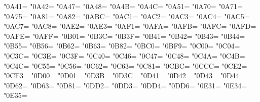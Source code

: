 \XeTeXcharclass"0A41=\KclassNum
\XeTeXcharclass"0A42=\KclassNum
\XeTeXcharclass"0A47=\KclassNum
\XeTeXcharclass"0A48=\KclassNum
\XeTeXcharclass"0A4B=\KclassNum
\XeTeXcharclass"0A4C=\KclassNum
\XeTeXcharclass"0A51=\KclassNum
\XeTeXcharclass"0A70=\KclassNum
\XeTeXcharclass"0A71=\KclassNum
\XeTeXcharclass"0A75=\KclassNum
\XeTeXcharclass"0A81=\KclassNum
\XeTeXcharclass"0A82=\KclassNum
\XeTeXcharclass"0ABC=\KclassNum
\XeTeXcharclass"0AC1=\KclassNum
\XeTeXcharclass"0AC2=\KclassNum
\XeTeXcharclass"0AC3=\KclassNum
\XeTeXcharclass"0AC4=\KclassNum
\XeTeXcharclass"0AC5=\KclassNum
\XeTeXcharclass"0AC7=\KclassNum
\XeTeXcharclass"0AC8=\KclassNum
\XeTeXcharclass"0AE2=\KclassNum
\XeTeXcharclass"0AE3=\KclassNum
\XeTeXcharclass"0AF1=\KclassNum
\XeTeXcharclass"0AFA=\KclassNum
\XeTeXcharclass"0AFB=\KclassNum
\XeTeXcharclass"0AFC=\KclassNum
\XeTeXcharclass"0AFD=\KclassNum
\XeTeXcharclass"0AFE=\KclassNum
\XeTeXcharclass"0AFF=\KclassNum
\XeTeXcharclass"0B01=\KclassNum
\XeTeXcharclass"0B3C=\KclassNum
\XeTeXcharclass"0B3F=\KclassNum
\XeTeXcharclass"0B41=\KclassNum
\XeTeXcharclass"0B42=\KclassNum
\XeTeXcharclass"0B43=\KclassNum
\XeTeXcharclass"0B44=\KclassNum
\XeTeXcharclass"0B55=\KclassNum
\XeTeXcharclass"0B56=\KclassNum
\XeTeXcharclass"0B62=\KclassNum
\XeTeXcharclass"0B63=\KclassNum
\XeTeXcharclass"0B82=\KclassNum
\XeTeXcharclass"0BC0=\KclassNum
\XeTeXcharclass"0BF9=\KclassNum
\XeTeXcharclass"0C00=\KclassNum
\XeTeXcharclass"0C04=\KclassNum
\XeTeXcharclass"0C3C=\KclassNum
\XeTeXcharclass"0C3E=\KclassNum
\XeTeXcharclass"0C3F=\KclassNum
\XeTeXcharclass"0C40=\KclassNum
\XeTeXcharclass"0C46=\KclassNum
\XeTeXcharclass"0C47=\KclassNum
\XeTeXcharclass"0C48=\KclassNum
\XeTeXcharclass"0C4A=\KclassNum
\XeTeXcharclass"0C4B=\KclassNum
\XeTeXcharclass"0C4C=\KclassNum
\XeTeXcharclass"0C55=\KclassNum
\XeTeXcharclass"0C56=\KclassNum
\XeTeXcharclass"0C62=\KclassNum
\XeTeXcharclass"0C63=\KclassNum
\XeTeXcharclass"0C81=\KclassNum
\XeTeXcharclass"0CBC=\KclassNum
\XeTeXcharclass"0CCC=\KclassNum
\XeTeXcharclass"0CE2=\KclassNum
\XeTeXcharclass"0CE3=\KclassNum
\XeTeXcharclass"0D00=\KclassNum
\XeTeXcharclass"0D01=\KclassNum
\XeTeXcharclass"0D3B=\KclassNum
\XeTeXcharclass"0D3C=\KclassNum
\XeTeXcharclass"0D41=\KclassNum
\XeTeXcharclass"0D42=\KclassNum
\XeTeXcharclass"0D43=\KclassNum
\XeTeXcharclass"0D44=\KclassNum
\XeTeXcharclass"0D62=\KclassNum
\XeTeXcharclass"0D63=\KclassNum
\XeTeXcharclass"0D81=\KclassNum
\XeTeXcharclass"0DD2=\KclassNum
\XeTeXcharclass"0DD3=\KclassNum
\XeTeXcharclass"0DD4=\KclassNum
\XeTeXcharclass"0DD6=\KclassNum
\XeTeXcharclass"0E31=\KclassNum
\XeTeXcharclass"0E34=\KclassNum
\XeTeXcharclass"0E35=\KclassNum

